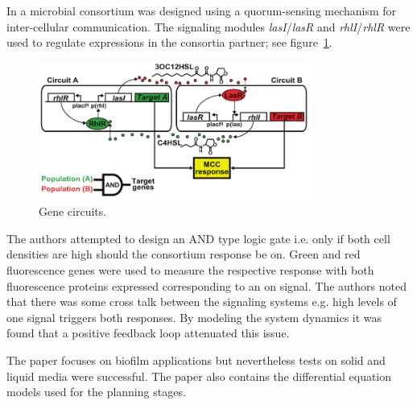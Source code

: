 \documentclass[float=false, crop=false]{standalone}
\begin{document}
	
	In \cite{Brenner2007} a microbial consortium was designed using a quorum-sensing mechanism for inter-cellular communication. The signaling modules \textit{lasI}/\textit{lasR} and \textit{rhlI}/\textit{rhlR} were used to regulate expressions in the consortia partner; see figure~\ref{fig:brenner2007_genecircuits}.
	
	\begin{figure}[H]
		\centering
		\includegraphics[width=0.8\textwidth]{brenner2007_genecircuits.png}
		\caption{Gene circuits.}
		\label{fig:brenner2007_genecircuits}
	\end{figure}	
	The authors attempted to design an AND type logic gate i.e. only if both cell densities are high should the consortium response be on. Green and red fluorescence genes were used to measure the respective response with both fluorescence proteins expressed corresponding to an on signal. The authors noted that there was some cross talk between the signaling systems e.g. high levels of one signal triggers both responses. By modeling the system dynamics it was found that a positive feedback loop attenuated this issue.
	
	The paper focuses on biofilm applications but nevertheless tests on solid and liquid media were successful. The paper also contains the differential equation models used for the planning stages.
	
	
	\ifstandalone
			
		
	\fi
\end{document}
